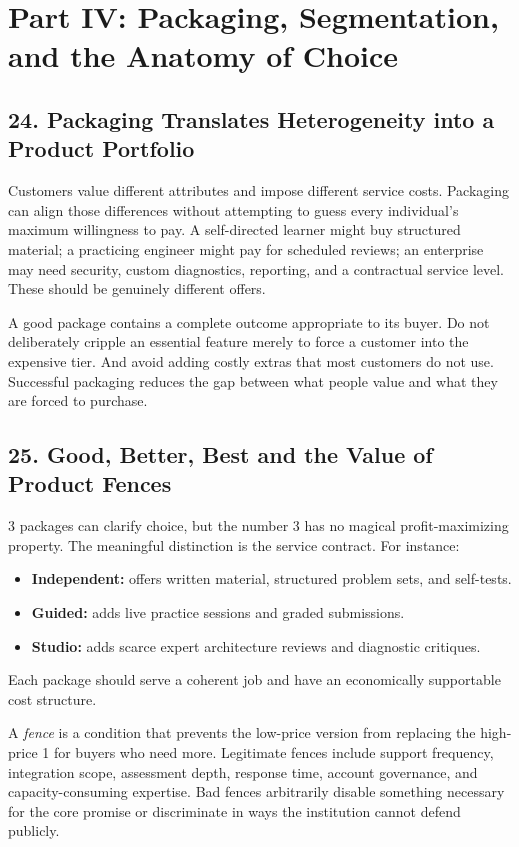 \section*{Part IV: Packaging, Segmentation, and the Anatomy of Choice}

\subsection*{24. Packaging Translates Heterogeneity into a Product Portfolio}

Customers value different attributes and impose different service costs. Packaging can align those differences without attempting to guess every individual's maximum willingness to pay. A self-directed learner might buy structured material; a practicing engineer might pay for scheduled reviews; an enterprise may need security, custom diagnostics, reporting, and a contractual service level. These should be genuinely different offers.

A good package contains a complete outcome appropriate to its buyer. Do not deliberately cripple an essential feature merely to force a customer into the expensive tier. And avoid adding costly extras that most customers do not use. Successful packaging reduces the gap between what people value and what they are forced to purchase.

\subsection*{25. Good, Better, Best and the Value of Product Fences}

3 packages can clarify choice, but the number 3 has no magical profit-maximizing property. The meaningful distinction is the service contract. For instance:
\begin{itemize}
  \item \textbf{Independent:} offers written material, structured problem sets, and self-tests.
  \item \textbf{Guided:} adds live practice sessions and graded submissions.
  \item \textbf{Studio:} adds scarce expert architecture reviews and diagnostic critiques.
\end{itemize}
Each package should serve a coherent job and have an economically supportable cost structure.

A \emph{fence} is a condition that prevents the low-price version from replacing the high-price 1 for buyers who need more. Legitimate fences include support frequency, integration scope, assessment depth, response time, account governance, and capacity-consuming expertise. Bad fences arbitrarily disable something necessary for the core promise or discriminate in ways the institution cannot defend publicly.


